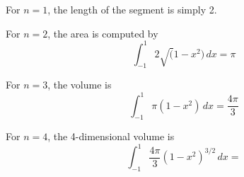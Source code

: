 

For $n=1$, the length of the segment is simply 2.

For $n=2$, the area is computed by 
$$
\int_{-1}^1 2 \sqrt(1-x^2)\,dx = \pi 
$$

For $n=3$, the volume is 
$$
\int_{-1}^1 \pi (1-x^2)\,dx = \frac{4\pi}{3} 
$$

For $n=4$, the 4-dimensional volume is 
$$
\int_{-1}^1 \frac{4\pi}{3} (1-x^2)^{3/2}\,dx = 
$$


